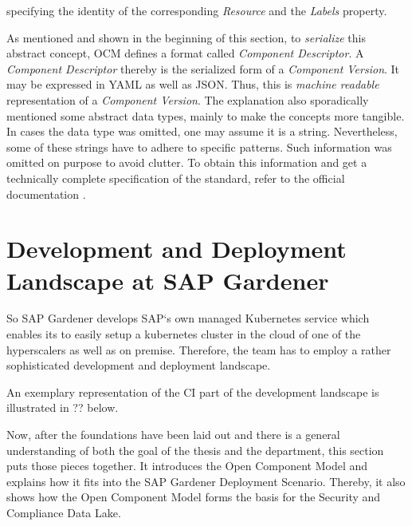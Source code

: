 specifying the identity of the corresponding \emph{Resource} and the \emph{Labels} property.\par
\noindent As mentioned and shown in the beginning of this section, to \emph{serialize} this abstract concept, OCM defines a format called \emph{Component Descriptor}. A \emph{Component Descriptor} thereby is the serialized form of a \emph{Component Version}. It may be expressed in YAML as well as JSON. Thus, this is \emph{machine readable} representation of a \emph{Component Version}. The explanation also sporadically mentioned some abstract data types, mainly to make the concepts more tangible. In cases the data type was omitted, one may assume it is a string. Nevertheless, some of these strings have to adhere to specific patterns. Such information was omitted on purpose to avoid clutter. To obtain this information and get a technically complete specification of the standard, refer to the official documentation \cite{OCMSpec}. 





\section{Development and Deployment Landscape at SAP Gardener}
So SAP Gardener develops SAP`s own managed Kubernetes service which enables its to easily setup a kubernetes cluster in the cloud of one of the hyperscalers as well as on premise. Therefore, the team has to employ a rather sophisticated development and deployment landscape.\par
An exemplary representation of the CI part of the development landscape is illustrated in ?? below.




Now, after the foundations have been laid out and there is a general understanding of both the goal of the thesis and the department, this section puts those pieces together. It introduces the Open Component Model and explains how it fits into the SAP Gardener Deployment Scenario. Thereby, it also shows how the Open Component Model forms the basis for the Security and Compliance Data Lake.

